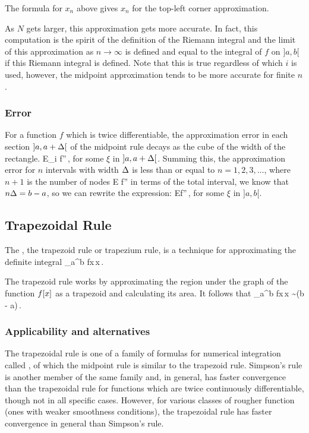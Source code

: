 The formula for $x_n$ above gives $x_n$ for the top-left corner approximation.

As $N$ gets larger, this approximation gets more accurate. In fact, this computation is the spirit of the definition of the Riemann integral and the limit of this approximation as $n\to\infty$ is defined and equal to the integral of $f$ on $]a,b[$ if this Riemann integral is defined. Note that this is true regardless of which $i$ is used, however, the midpoint approximation tends to be more accurate for finite $n$.


\subsubsection{Error}
For a function $f$ which is twice differentiable, the approximation error in each section $]a, a+\Delta[$ of the midpoint rule decays as the cube of the width of the rectangle.
\beq
E_i \leq {}f''\vat{\xi}\,,
\eeq
for some $\xi$ in $]a, a+\Delta[$. Summing this, the approximation error for $n$ intervals with width $\Delta$ is less than or equal to $n = 1,2,3,\dotsc$, where $n+1$ is the number of nodes
\beq
E \leq {}f''\vat{\xi}
\eeq
in terms of the total interval, we know that $n\Delta = b - a$, so we can rewrite the expression:
\beq
E\leq {}f''\vat\xi\,,
\eeq
for some $\xi$ in $]a,b[$.


\subsection{Trapezoidal Rule}
The , \aka the trapezoid rule or trapezium rule, is a technique for approximating the definite integral
\beq
\int_a^b f\vat x\,\dx x\,.
\eeq

The trapezoid rule works by approximating the region under the graph of the function $f\!\left[{x}\right]$ as a trapezoid and calculating its area. It follows that
\beq
\int_a^b f\vat x\,\dx x \sim (b - a)\,.
\eeq


\subsubsection{Applicability and alternatives}
The trapezoidal rule is one of a family of formulas for numerical integration called , of which the midpoint rule is similar to the trapezoid rule. Simpson's rule is another member of the same family and, in general, has faster convergence than the trapezoidal rule for functions which are twice continuously differentiable, though not in all specific cases. However, for various classes of rougher function (ones with weaker smoothness conditions), the trapezoidal rule has faster convergence in general than Simpson's rule.


